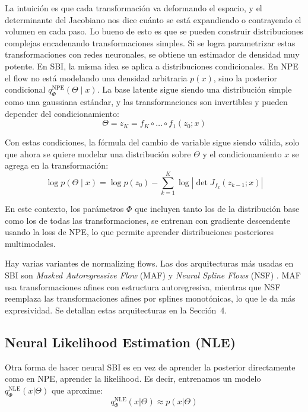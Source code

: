 La intuición es que cada transformación va deformando el espacio, y el determinante del Jacobiano nos dice cuánto se está expandiendo o contrayendo el volumen en cada paso. Lo bueno de esto es que se pueden construir distribuciones complejas encadenando transformaciones simples. Si se logra parametrizar estas transformaciones con redes neuronales, se obtiene un estimador de densidad muy potente. En SBI, la misma idea se aplica a distribuciones condicionales. En NPE el flow no está modelando una densidad arbitraria $p(x)$, sino la posterior condicional $q_{\Phi}^{\text{NPE}}(\Theta\mid x)$. La base latente sigue siendo una distribución simple como una gaussiana estándar, y las transformaciones son invertibles y pueden depender del condicionamiento:
\begin{equation}
\Theta = z_K = f_K \circ \dots \circ f_1 (z_0; x)
\end{equation}

Con estas condiciones, la fórmula del cambio de variable sigue siendo válida, solo que ahora se quiere modelar una distribución sobre $\Theta$ y el condicionamiento $x$ se agrega en la transformación:
\begin{equation}
\log p(\Theta \mid x) = \log p(z_0) - \sum_{k=1}^{K} \log \left| \det J_{f_k}(z_{k-1}; x) \right|
\label{eq:flow_log_prob}
\end{equation}

En este contexto, los parámetros $\Phi$ que incluyen tanto los de la distribución base como los de todas las transformaciones, se entrenan con gradiente descendente usando la loss de NPE, lo que permite aprender distribuciones posteriores multimodales. 

Hay varias variantes de normalizing flows. Las dos arquitecturas más usadas en SBI son \textit{Masked Autoregressive Flow} (MAF) \cite{papamakarios2018maf} y \textit{Neural Spline Flows} (NSF) \cite{durkan2019nsf}. MAF usa transformaciones afines con estructura autoregresiva, mientras que NSF reemplaza las transformaciones afines por splines monotónicas, lo que le da más expresividad. Se detallan estas arquitecturas en la Sección~4. 

\subsection{Neural Likelihood Estimation (NLE)}

Otra forma de hacer neural SBI es en vez de aprender la posterior directamente como en NPE, aprender la likelihood. Es decir, entrenamos un modelo $q_{\Phi}^{\text{NLE}}(x|\Theta)$ que aproxime:
\begin{equation}
q_{\Phi}^{\text{NLE}}(x|\Theta) \approx p(x|\Theta)
\end{equation}

